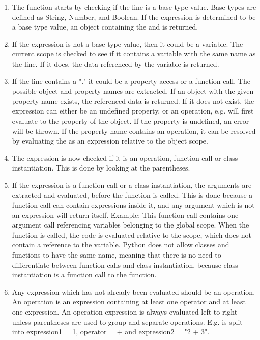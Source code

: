 \begin{enumerate}
    \item The function starts by checking if the line is a base type value. Base types are defined as String, Number, and Boolean. If the expression is determined to be a base type value, an object containing the  and  is returned. 
    \item If the expression is not a base type value, then it could be a variable. The current scope is checked to see if it contains a variable with the same name as the line. If it does, the data referenced by the variable is returned.
    \item If the line contains a "." it could be a property access or a function call. The possible object and property names are extracted. If an object with the given property name exists, the referenced data is returned. If it does not exist, the expression can either be an undefined property, or an operation, e.g.  will first evaluate to the property  of the  object. If the property is undefined, an error will be thrown. If the property name contains an operation, it can be resolved by evaluating the  as an expression relative to the object scope.
    \item The expression is now checked if it is an operation, function call or class instantiation. This is done by looking at the parentheses.
    \item If the expression is a function call or a class instantiation, the arguments are extracted and evaluated, before the function is called. This is done because a function call can contain expressions inside it, and any argument which is not an expression will return itself. Example: This  function call contains one argument call referencing variables belonging to the global scope. When the function is called, the code is evaluated relative to the  scope, which does not contain a reference to the  variable. Python does not allow classes and functions to have the same name, meaning that there is no need to differentiate between function calls and class instantiation, because class instantiation is a function call to the  function.
    \item Any expression which has not already been evaluated should be an operation. An operation is an expression containing at least one operator and at least one expression. An operation expression is always evaluated left to right unless parentheses are used to group and separate operations. E.g.  is split into expression1 = 1, operator = + and expression2 = "2 + 3".
\end{enumerate}
